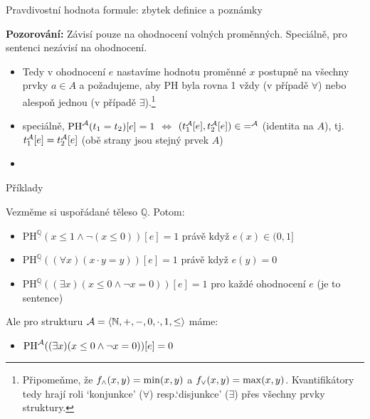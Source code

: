 \documentclass{beamer}
\begin{document}
\begin{frame}{Pravdivostní hodnota formule: zbytek definice a poznámky}
    

    \textbf{Pozorování:} Závisí pouze na ohodnocení volných proměnných. Speciálně, pro sentenci nezávisí na ohodnocení.

    \begin{itemize}
        \item Tedy v ohodnocení $e$ nastavíme hodnotu proměnné $x$ postupně na všechny prvky $a\in A$ a požadujeme, aby PH byla rovna 1 vždy (v případě $\forall$) nebo alespoň jednou (v případě $\exists$).\footnote{Připomeňme, že $f_{\land}(x,y)=\min(x,y)$ a $f_{\lor}(x,y)=\max(x,y)$. Kvantifikátory tedy hrají roli `konjunkce' ($\forall$) resp.`disjunkce' ($\exists$) přes všechny prvky struktury.}
        \item speciálně, $\mathrm{PH}^{\mathcal{A}}(t_1=t_2)[e]=1$ $\Leftrightarrow$ $(t_1^{\mathcal{A}}[e],t_2^{\mathcal{A}}[e])\in {=^{\mathcal{A}}}$ (\alert{identita} na $A$), tj. $t_1^{\mathcal{A}}[e]=t_2^{\mathcal{A}}[e]$ (obě strany jsou stejný prvek $A$)
        \item 
    \end{itemize}
    
\end{frame}


\begin{frame}{Příklady}
    
    Vezměme si uspořádané těleso $\underline{\mathbb Q}$. Potom:
    \begin{itemize}
        \item $\mathrm{PH}^{\underline{\mathbb Q}}(x\leq 1 \land \neg (x\leq 0))[e]=1$ právě když $e(x)\in (0,1]$
        \item $\mathrm{PH}^{\underline{\mathbb Q}}((\forall x)(x\cdot y = y))[e]=1$ právě když $e(y)=0$
        \item $\mathrm{PH}^{\underline{\mathbb Q}}((\exists x)(x \leq 0 \land \neg x=0))[e]=1$ pro každé ohodnocení $e$ (je to sentence)
    \end{itemize}   
    Ale pro strukturu $\mathcal{A}=\langle \mathbb N,+,-,0,\cdot,1,\leq\rangle$ máme: 
    \begin{itemize}
        \item $\mathrm{PH}^{\mathcal{A}}((\exists x)(x \leq 0 \land \neg x=0))[e]=0$ 
    \end{itemize}     

\end{frame}
\end{document}
